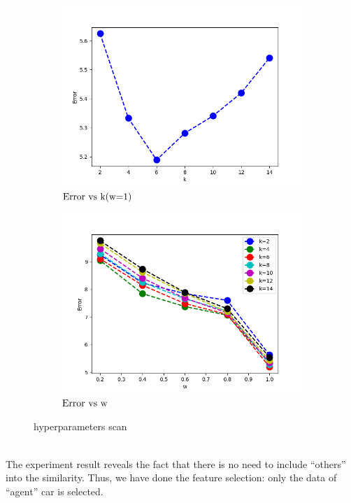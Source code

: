     \begin{figure}[h]
        \centering
        \begin{subfigure}[h]{0.6\textwidth}
            \centering
            \includegraphics[width=\textwidth]{../figs/scan_k.png}
            \caption{$\textnormal{Error vs k(w=1)}$}
            \label{Error vs k}
        \end{subfigure}
        \hfill
        \begin{subfigure}[h]{0.6\textwidth}
            \centering
            \includegraphics[width=\textwidth]{../figs/scan_w.png}
            \caption{$\textnormal{Error vs w}$}
            \label{Error vs w}
        \end{subfigure}
        \caption{hyperparameters scan}
        \label{Hyperparameters scan}
   \end{figure}\\
   The experiment result reveals the fact that there is no need to include ``others'' into the similarity. Thus, we have done the feature selection: only the data of ``agent'' car is selected. 
